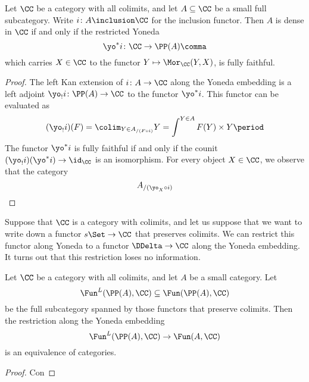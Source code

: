 \begin{proposition}
  Let $\CC$ be a category with all colimits, and let $A \subseteq \CC$ be a small full subcategory.
  Write $i \colon A \inclusion \CC$ for the inclusion functor.
  Then $A$ is dense in $\CC$ if and only if the restricted Yoneda
  \[
    \yo^{\ast} i \colon \CC \to \PP(A) \comma
  \]
  which carries $X \in \CC$ to the functor $Y \mapsto \Mor_{\CC}(Y,X)$, is fully faithful.
\end{proposition}

\begin{proof}
  The left Kan extension of $i \colon A \to \CC$ along the Yoneda embedding is a left adjoint $\yo_!i \colon \PP(A) \to \CC$ to the functor $\yo^{\ast}i$.
  This functor can be evaluated as
  \[
    (\yo_!i)(F) = \colim_{Y \in A_{/(F \circ i)}} Y = \int^{Y \in A} F(Y) \times Y \period
  \]
  The functor $\yo^{\ast}i$ is fully faithful if and only if the counit $(\yo_!i)(\yo^{\ast}i) \to \id_{\CC}$ is an isomorphism.
  For every object $X \in \CC$, we observe that the category
  \[
    A_{/(\yo_X \circ i)}
  \]


\end{proof}

Suppose that $\CC$ is a category with colimits, and
let us suppose that we want to write down a functor $s\Set \to \CC$ that preserves colimits.
We can restrict this functor along Yoneda to a functor $\DDelta \to \CC$ along the Yoneda embedding.
It turns out that this restriction loses no information.

\begin{proposition}
  Let $\CC$ be a category with all colimits,
  and let $A$ be a small category.
  Let
  \[
    \Fun^L(\PP(A),\CC) \subseteq \Fun(\PP(A),\CC)
  \]
  be the full subcategory spanned by those functors that preserve colimits.
  Then the restriction along the Yoneda embedding
  \[
    \Fun^L(\PP(A),\CC) \to \Fun(A,\CC)
  \]
  is an equivalence of categories.
\end{proposition}

\begin{proof}
  Con
\end{proof}
